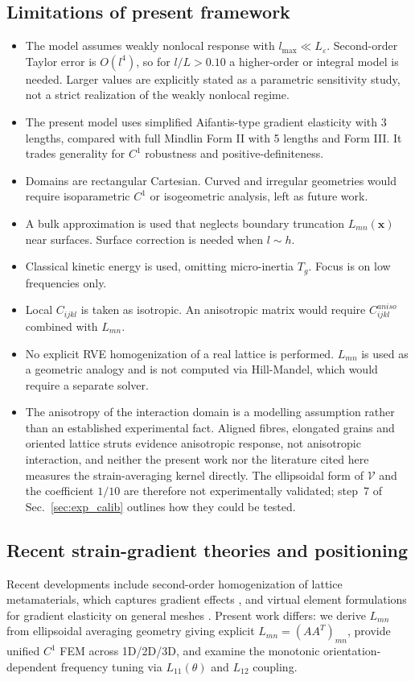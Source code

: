 \documentclass[final,3p,times,fleqn]{elsarticle}
\begin{document}
\subsection{Limitations of present framework}
\begin{itemize}
  \item The model assumes weakly nonlocal response with $l_{\max}\ll L_\varepsilon$. Second-order Taylor error is $O(l^4)$, so for $l/L>0.10$ a higher-order or integral model is needed. Larger values are explicitly stated as a parametric sensitivity study, not a strict realization of the weakly nonlocal regime.
  \item The present model uses simplified Aifantis-type gradient elasticity with 3 lengths, compared with full Mindlin Form II with 5 lengths and Form III. It trades generality for $C^1$ robustness and positive-definiteness.
  \item Domains are rectangular Cartesian. Curved and irregular geometries would require isoparametric $C^1$ or isogeometric analysis, left as future work.
  \item A bulk approximation is used that neglects boundary truncation $L_{mn}(\mathbf{x})$ near surfaces. Surface correction is needed when $l\sim h$.
  \item Classical kinetic energy is used, omitting micro-inertia $T_g$. Focus is on low frequencies only.
  \item Local $C_{ijkl}$ is taken as isotropic. An anisotropic matrix would require $C^{aniso}_{ijkl}$ combined with $L_{mn}$.
  \item No explicit RVE homogenization of a real lattice is performed. $L_{mn}$ is used as a geometric analogy and is not computed via Hill-Mandel, which would require a separate solver.

  \item The anisotropy of the interaction domain is a modelling
  assumption rather than an established experimental fact. Aligned fibres,
  elongated grains and oriented lattice struts evidence anisotropic
  response, not anisotropic interaction, and neither the present work nor
  the literature cited here measures the strain-averaging kernel directly.
  The ellipsoidal form of $\mathcal{V}$ and the coefficient $1/10$ are
  therefore not experimentally validated; step~7 of
  Sec.~\ref{sec:exp_calib} outlines how they could be tested.
\end{itemize}

\subsection{Recent strain-gradient theories and positioning}
Recent developments include second-order homogenization of lattice metamaterials, which captures gradient effects \cite{Molavitabrizi2023}, and virtual element formulations for gradient elasticity on general meshes \cite{WriggersHudobivnik2023}. Present work differs: we derive $L_{mn}$ from ellipsoidal averaging geometry giving explicit $L_{mn}=(AA^T)_{mn}$, provide unified $C^1$ FEM across 1D/2D/3D, and examine the monotonic orientation-dependent frequency tuning via $L_{11}(\theta)$ and $L_{12}$ coupling.
\end{document}
